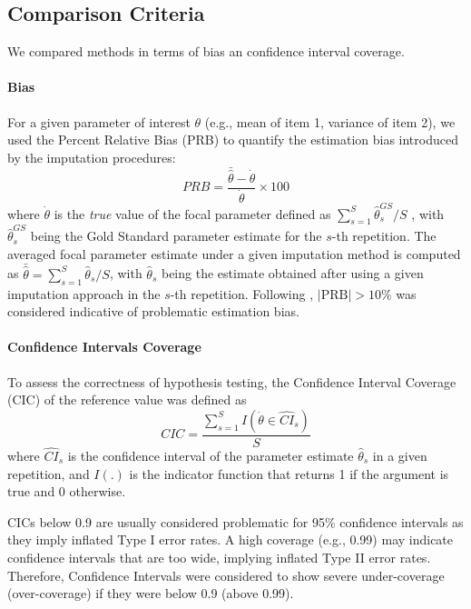 \subsection{Comparison Criteria} \label{criteria}

	We compared methods in terms of bias an confidence interval coverage.

	\paragraph{Bias}

	For a given parameter of interest $\theta$ (e.g., mean of item 1, variance of item 2), we used the 
	Percent Relative Bias (PRB) to quantify the estimation bias introduced by the imputation procedures:
%
	\begin{equation} \label{eqn:prb}
		PRB = \frac{\bar{\hat{\theta}} - \dot{\theta}}{\dot{\theta}} \times 100
	\end{equation}
%
	where $\dot{\theta}$ is the \emph{true} value of the focal parameter defined as 
	$\sum_{s=1}^{S} \hat{\theta}_{s}^{GS}/S$
	, with
	$\hat{\theta}_{s}^{GS}$ 
	being the Gold Standard parameter estimate for the $s$-th repetition. 
	The averaged focal parameter estimate under a given imputation method is computed as 
	$\bar{\hat{\theta}} = \sum_{s=1}^{S} \hat{\theta}_{s}/S$,
	with
	$\hat{\theta}_{s}$ being the estimate obtained after using a given imputation approach in the 
	$s$-th repetition.
	Following \cite{muthenEtAl:1987}, $|\text{PRB}| > 10\%$ was considered indicative of problematic 
	estimation bias.

	\paragraph{Confidence Intervals Coverage}
	To assess the correctness of hypothesis testing, the Confidence Interval Coverage (CIC) of the reference value
	was defined as
%
	\begin{equation} \label{eqn:cic}
		CIC =  \frac{ \sum_{s=1}^{S} I(\dot{\theta} \in \widehat{CI}_s ) }{S}
	\end{equation}
%
	where $\widehat{CI}_s$ is the confidence interval of the parameter estimate $\hat{\theta}_{s}$ in a given repetition, 
	and $I(.)$ is the indicator function that returns 1 if the argument is true and 0 otherwise.
	
	CICs below 0.9 are usually considered problematic for 95\% confidence intervals \cite[p. 52]{vanBuuren:2018} 
	as they imply inflated Type I error rates.
	A high coverage (e.g., 0.99) may indicate confidence intervals that are too wide, implying inflated Type II error rates.
	Therefore, Confidence Intervals were considered to show severe under-coverage (over-coverage) if they were 
	below 0.9 (above 0.99).

